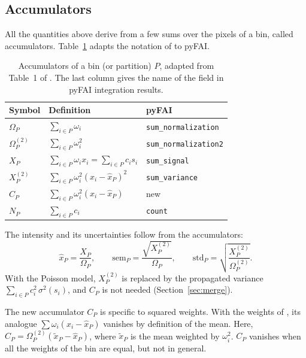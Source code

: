 \documentclass{iucrjournals}
\newcommand{\mean}[1]{\widehat{#1}}
\newcommand{\Om}{\Omega}
\newcommand{\OmS}{\Omega^{(2)}}
\newcommand{\XX}{X^{(2)}}
\begin{document}
\subsection{Accumulators}
\label{sec:accumulators}

All the quantities above derive from a few sums over the pixels of a bin, called accumulators.
Table~\ref{tab:notation} adapts the notation of  to pyFAI.

\begin{table}[ht]
\caption{Accumulators of a bin (or partition) $P$, adapted from Table~1 of \protect{}.
The last column gives the name of the field in pyFAI integration results.}
\label{tab:notation}
\smallskip
\begin{center}
\begin{tabular}{lll}
\midrule
Symbol & Definition & pyFAI \\
\midrule
$\Om_P$  & $\sum_{i\in P}\omega_i$ & \texttt{sum\_normalization} \\
$\OmS_P$ & $\sum_{i\in P}\omega_i^2$ & \texttt{sum\_normalization2} \\
$X_P$    & $\sum_{i\in P}\omega_i x_i = \sum_{i\in P}c_i s_i$ & \texttt{sum\_signal} \\
$\XX_P$   & $\sum_{i\in P}\omega_i^2(x_i-\mean{x}_P)^2$ & \texttt{sum\_variance} \\
$C_P$    & $\sum_{i\in P}\omega_i^2(x_i-\mean{x}_P)$ & new \\
$N_P$    & $\sum_{i\in P}c_i$ & \texttt{count} \\
\midrule
\end{tabular}
\end{center}
\end{table}

The intensity and its uncertainties follow from the accumulators:
\begin{equation}
  \mean{x}_P = \frac{X_P}{\Om_P}, \qquad
  \mathrm{sem}_P = \frac{\sqrt{\XX_P}}{\Om_P}, \qquad
  \mathrm{std}_P = \sqrt{\frac{\XX_P}{\OmS_P}}.
  \label{eq:results}
\end{equation}
With the Poisson model, $\XX_P$ is replaced by the propagated variance $\sum_{i\in P}c_i^2\,\sigma^2(s_i)$, and $C_P$ is not needed (Section~\ref{sec:merge}).

The new accumulator $C_P$ is specific to squared weights.
With the weights of , its analogue $\sum\omega_i(x_i-\mean{x}_P)$ vanishes by definition of the mean.
Here, $C_P=\OmS_P\left(\tilde{x}_P-\mean{x}_P\right)$, where $\tilde{x}_P$ is the mean weighted by $\omega_i^2$.
$C_P$ vanishes when all the weights of the bin are equal, but not in general.
\end{document}
